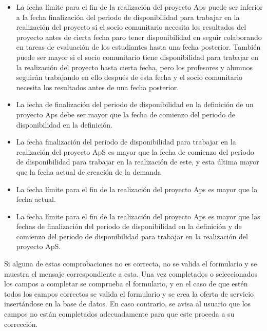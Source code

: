 \documentclass[11pt]{book}
\begin{document}
	\begin{itemize}
		\item La fecha límite para el fin de la realización del proyecto Aps puede ser inferior a la fecha finalización del periodo de disponibilidad para trabajar en la realización del proyecto si el socio comunitario necesita los resultados del proyecto antes de cierta fecha paro tener disponibilidad en seguir colaborando en tareas de evaluación de los estudiantes hasta una fecha posterior. También puede ser mayor si el socio
		comunitario tiene disponibilidad para trabajar en la realización del
		proyecto hasta cierta fecha, pero los profesores y alumnos seguirán
		trabajando en ello después de esta fecha y el socio comunitario necesita
		los resultados antes de una fecha posterior.
		\item La fecha de finalización del periodo de disponibilidad en la definición de un proyecto Aps debe ser mayor que la fecha de comienzo del periodo de disponibilidad en la definición.
		\item La fecha finalización del periodo de disponibilidad para trabajar en la realización
		del proyecto ApS es mayor que la fecha de comienzo del periodo de disponibilidad para trabajar en la realización de este, y esta última mayor que la fecha actual de creación de la demanda 
		\item La fecha límite para el fin de la realización del proyecto Aps es mayor que la fecha actual.
		\item La fecha límite para el fin de la realización del proyecto Aps es mayor que las fechas de finalización del periodo de disponibilidad en la definición y de comienzo del periodo de disponibilidad para trabajar en la realización del proyecto ApS. 
		
	\end{itemize}
	Si alguna de estas comprobaciones no es correcta, no se valida el formulario y se muestra el mensaje correspondiente a esta. Una vez completados o seleccionados los campos a completar se comprueba el formulario, y en el caso de que estén todos los campos correctos se valida el formulario y se crea la oferta de servicio insertándose en la base de datos. En caso contrario, se avisa al usuario que los campos no están completados adecuadamente para que este proceda a su corrección.\\\\
	
\end{document}
